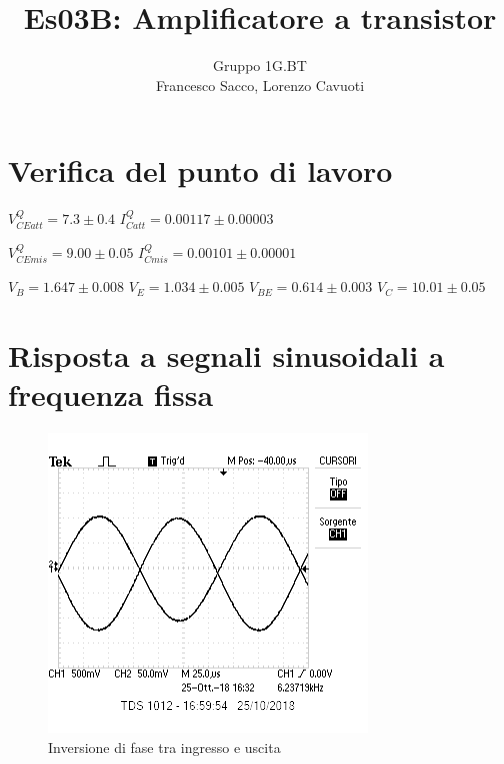 \documentclass[10pt,a4paper]{article}
\author{Gruppo 1G.BT \\ Francesco Sacco, Lorenzo Cavuoti}
\title{Es03B: Amplificatore a transistor}
\begin{document}
	\maketitle
	\section{Verifica del punto di lavoro}
	
	$V_{CEatt}^Q = 7.3\pm0.4$
	$I_{Catt}^Q = 0.00117\pm0.00003$

	$V_{CEmis}^Q = 9.00\pm0.05$
	$I_{Cmis}^Q = 0.00101\pm0.00001$
	
	$V_{B} = 1.647\pm0.008$
	$V_{E} = 1.034\pm 0.005$
	$V_{BE} = 0.614\pm0.003$
	$V_{C} = 10.01\pm0.05$
	
	\section{Risposta a segnali sinusoidali a frequenza fissa}
	\begin{figure}
	\centering
	\includegraphics[scale=0.7]{3_1.png}
	\caption{Inversione di fase tra ingresso e uscita} 
	\end{figure}
		
\end{document}

